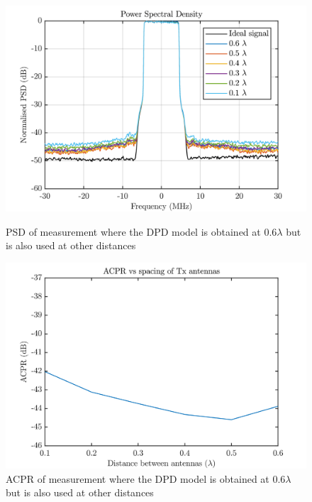 \begin{figure}[H]
  \centering
  \begin{minipage}[b]{0.5\textwidth}
	\includegraphics[scale = 0.5]{figures/measurement/cree/meas4/PSD_dif.png}
	\caption{PSD of measurement where the DPD model is obtained at 0.6$\lambda$ but is also used at other distances}	
    \label{fig:meas4_amam5_4}
  \end{minipage}
  \hfill
  \begin{minipage}[b]{0.4\textwidth}
	\includegraphics[scale = 0.5]{figures/measurement/cree/meas4/ACPR_dif.png}
	\caption{ACPR of measurement where the DPD model is obtained at 0.6$\lambda$ but is also used at other distances}
    \label{fig:meas4_amam6_4}
  \end{minipage}
\end{figure}



